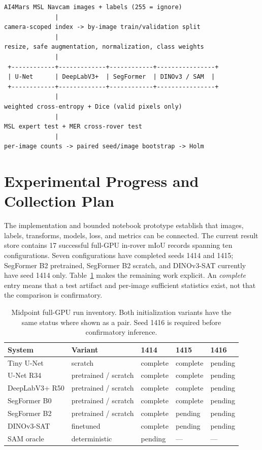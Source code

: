 \documentclass[11pt]{article}
\newcommand{\miou}{\ensuremath{\mathrm{mIoU}}}
\begin{document}
\begin{verbatim}
AI4Mars MSL Navcam images + labels (255 = ignore)
              |
camera-scoped index -> by-image train/validation split
              |
resize, safe augmentation, normalization, class weights
              |
 +------------+-------------+------------+----------------+
 | U-Net      | DeepLabV3+  | SegFormer  | DINOv3 / SAM  |
 +------------+-------------+------------+----------------+
              |
weighted cross-entropy + Dice (valid pixels only)
              |
MSL expert test + MER cross-rover test
              |
per-image counts -> paired seed/image bootstrap -> Holm
\end{verbatim}

\section{Experimental Progress and Collection Plan}

The implementation and bounded notebook prototype establish that images, labels, transforms,
models, loss, and metrics can be connected. The current result store contains 17 successful
full-GPU in-rover \miou{} records spanning ten configurations. Seven configurations have completed
seeds 1414 and 1415; SegFormer B2 pretrained, SegFormer B2 scratch, and DINOv3-SAT currently have
seed 1414 only. Table~\ref{tab:inventory} makes the remaining work explicit. An \emph{complete}
entry means that a test artifact and per-image sufficient statistics exist, not that the comparison
is confirmatory.

\begin{table}[ht]
\centering
\caption{Midpoint full-GPU run inventory. Both initialization variants have the same status where
shown as a pair. Seed 1416 is required before confirmatory inference.}
\label{tab:inventory}
\begin{tabular}{@{}lllll@{}}
\toprule
System & Variant & 1414 & 1415 & 1416 \\
\midrule
Tiny U-Net & scratch & complete & complete & pending \\
U-Net R34 & pretrained / scratch & complete & complete & pending \\
DeepLabV3+ R50 & pretrained / scratch & complete & complete & pending \\
SegFormer B0 & pretrained / scratch & complete & complete & pending \\
SegFormer B2 & pretrained / scratch & complete & pending & pending \\
DINOv3-SAT & finetuned & complete & pending & pending \\
SAM oracle & deterministic & pending & --- & --- \\
\bottomrule
\end{tabular}
\end{table}
\end{document}
